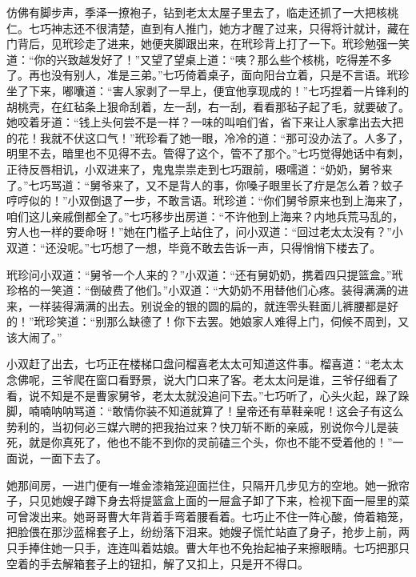 \par 仿佛有脚步声，季泽一撩袍子，钻到老太太屋子里去了，临走还抓了一大把核桃仁。七巧神志还不很清楚，直到有人推门，她方才醒了过来，只得将计就计，藏在门背后，见玳珍走了进来，她便夹脚跟出来，在玳珍背上打了一下。玳珍勉强一笑道：“你的兴致越发好了！”又望了望桌上道：“咦？那么些个核桃，吃得差不多了。再也没有别人，准是三弟。”七巧倚着桌子，面向阳台立着，只是不言语。玳珍坐了下来，嘟囔道：“害人家剥了一早上，便宜他享现成的！”七巧捏着一片锋利的胡桃壳，在红毡条上狠命刮着，左一刮，右一刮，看看那毡子起了毛，就要破了。她咬着牙道：“钱上头何尝不是一样？一味的叫咱们省，省下来让人家拿出去大把的花！我就不伏这口气！”玳珍看了她一眼，冷冷的道：“那可没办法了。人多了，明里不去，暗里也不见得不去。管得了这个，管不了那个。”七巧觉得她话中有刺，正待反唇相讥，小双进来了，鬼鬼祟祟走到七巧跟前，嗫嚅道：“奶奶，舅爷来了。”七巧骂道：“舅爷来了，又不是背人的事，你嗓子眼里长了疔是怎么着？蚊子哼哼似的！”小双倒退了一步，不敢言语。玳珍道：“你们舅爷原来也到上海来了，咱们这儿亲戚倒都全了。”七巧移步出房道：“不许他到上海来？内地兵荒马乱的，穷人也一样的要命呀！”她在门槛子上站住了，问小双道：“回过老太太没有？”小双道：“还没呢。”七巧想了一想，毕竟不敢去告诉一声，只得悄悄下楼去了。
\par 玳珍问小双道：“舅爷一个人来的？”小双道：“还有舅奶奶，携着四只提篮盒。”玳珍格的一笑道：“倒破费了他们。”小双道：“大奶奶不用替他们心疼。装得满满的进来，一样装得满满的出去。别说金的银的圆的扁的，就连零头鞋面儿裤腰都是好的！”玳珍笑道：“别那么缺德了！你下去罢。她娘家人难得上门，伺候不周到，又该大闹了。”
\par 小双赶了出去，七巧正在楼梯口盘问榴喜老太太可知道这件事。榴喜道：“老太太念佛呢，三爷爬在窗口看野景，说大门口来了客。老太太问是谁，三爷仔细看了看，说不知是不是曹家舅爷，老太太就没追问下去。”七巧听了，心头火起，跺了跺脚，喃喃呐呐骂道：“敢情你装不知道就算了！皇帝还有草鞋亲呢！这会子有这么势利的，当初何必三媒六聘的把我抬过来？快刀斩不断的亲戚，别说你今儿是装死，就是你真死了，他也不能不到你的灵前磕三个头，你也不能不受着他的！”一面说，一面下去了。
\par 她那间房，一进门便有一堆金漆箱笼迎面拦住，只隔开几步见方的空地。她一掀帘子，只见她嫂子蹲下身去将提篮盒上面的一屉盒子卸了下来，检视下面一屉里的菜可曾泼出来。她哥哥曹大年背着手弯着腰看着。七巧止不住一阵心酸，倚着箱笼，把脸偎在那沙蓝棉套子上，纷纷落下泪来。她嫂子慌忙站直了身子，抢步上前，两只手捧住她一只手，连连叫着姑娘。曹大年也不免抬起袖子来擦眼睛。七巧把那只空着的手去解箱套子上的钮扣，解了又扣上，只是开不得口。
